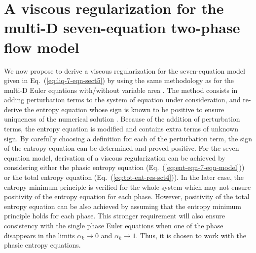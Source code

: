 \documentclass[preprint,10pt]{elsarticle}
\newcommand{\eqt}[1]{Eq.~(\ref{#1})}                     %
\begin{document}
\section{A viscous regularization for the multi-D seven-equation two-phase flow model}\label{sec:visc-regu}
%
We now propose to derive a viscous regularization for the seven-equation model given in \eqt{eq:liq-7-eqn-sect5} by using the same methodology as for the multi-D Euler equations with/without variable area \cite{jlg, Marco_paper_low_mach}. The method consists in adding perturbation terms to the system of equation under consideration, and re-derive the entropy equation whose sign is known to be positive to ensure uniqueness of the numerical solution \cite{Leveque}. Because of the addition of perturbation terms, the entropy equation is modified and contains extra terms of unknown sign. By carefully choosing a definition for each of the perturbation term, the sign of the entropy equation can be determined and proved positive. For the seven-equation model, derivation of a viscous regularization can be achieved by considering either the phasic entropy equation (\eqt{eq:ent-eqn-7-eqn-model}) or the total entropy equation (\eqt{eq:tot-ent-res-sct4}). In the later case, the entropy minimum principle is verified for the whole system which may not ensure positivity of the entropy equation for each phase. However, positivity of the total entropy equation can be also achieved by assuming that the entropy minimum principle holds for each phase. This stronger requirement will also ensure consistency with the single phase Euler equations when one of the phase disappears in the limits $\alpha_k \to 0$ and $\alpha_k \to 1$. Thus, it is chosen to work with the phasic entropy equations.
\end{document}
